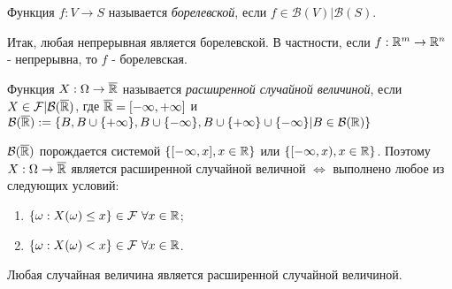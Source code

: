 \begin{definition}\label{lect05:def3}
	Функция $f: V \to S$ называется \textit{борелевской}, если $f \in \mathcal{B}(V)|\mathcal{B}(S)$.
\end{definition}
Итак, любая непрерывная является борелевской. В частности, если $f: \mathbb{R}^m \to \mathbb{R}^n$ - непрерывна, то $f$ - борелевская.
\begin{definition}\label{lect05:def4}
	Функция $X: \Omega \to \overline{\mathbb{R}}$ называется \textit{расширенной случайной величиной}, если $X \in \mathcal{F}|\mathcal{B}(\overline{\mathbb{R}})$, где $\overline{\mathbb{R}} = [-\infty, +\infty]$ и $\mathcal{B}(\overline{\mathbb{R}}) := \{B, B \cup \{+\infty\}, B \cup \{-\infty\}, B \cup \{+\infty\}\cup \{-\infty\} | B \in \mathcal{B}(\mathbb{R})\}$
\end{definition}
\begin{nb}\label{lect05:nb1}
	$\mathcal{B}(\overline{\mathbb{R}})$ порождается системой $\{ [-\infty, x], x \in \mathbb{R}\}$ или $\{ [-\infty, x), x \in \mathbb{R}\}$. Поэтому $X: \Omega \to \overline{\mathbb{R}}$ является расширенной случайной величной $\iff$  выполнено любое из следующих условий:
	\begin{enumerate}
		\item $\{\omega: X(\omega) \leq x\} \in \mathcal{F} \,\, \forall x \in \mathbb{R}$;
		\item $\{\omega: X(\omega) < x\} \in \mathcal{F} \,\, \forall x \in \mathbb{R}$.
	\end{enumerate}
	
	Любая случайная величина является расширенной случайной величиной.
\end{nb}

